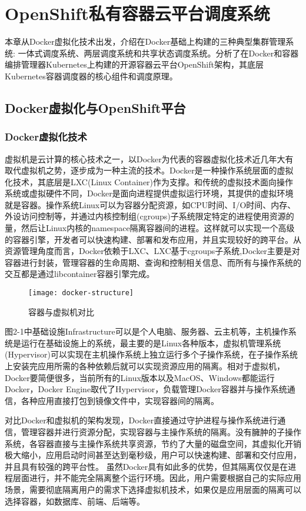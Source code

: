 \chapter{OpenShift私有容器云平台调度系统}
\label{cha:intro}
本章从Docker虚拟化技术出发，介绍在Docker基础上构建的三种典型集群管理系统: 一体式调度系统、两层调度系统和共享状态调度系统。分析了在Docker和容器编排管理器Kubernetes上构建的开源容器云平台OpenShift架构，其底层Kubernetes容器调度器的核心组件和调度原理。

\section{Docker虚拟化与OpenShift平台}
\label{sec:first}
\subsection{Docker虚拟化技术}
虚拟机是云计算的核心技术之一，以Docker为代表的容器虚拟化技术近几年大有取代虚拟机之势，逐步成为一种主流的技术。Docker是一种操作系统层面的虚拟化技术，其底层是LXC(Linux Container)作为支撑。和传统的虚拟技术面向操作系统或虚拟硬件不同，Docker是面向进程提供虚拟运行环境，其提供的虚拟环境就是容器。操作系统Linux可以为容器分配资源，如CPU时间、I/O时间、内存、外设访问控制等，并通过内核控制组(cgroups)子系统限定特定的进程使用资源的量，然后让Linux内核的namespace隔离容器间的进程。这样就可以实现一个高级的容器引擎，开发者可以快速构建、部署和发布应用，并且实现较好的跨平台。从资源管理角度而言，Docker依赖于LXC、LXC基于cgroups子系统,Docker主要是对容器进行封装，管理容器的生命周期、查询和控制相关信息、而所有与操作系统的交互都是通过libcontainer容器引擎完成。
\begin{figure}[H] %
	\centering
	\texttt{[image: docker-structure]}
	\caption{容器与虚拟机对比}
	\label{fig:xfig1}
\end{figure}
图2-1中基础设施Infrastructure可以是个人电脑、服务器、云主机等，主机操作系统是运行在基础设施上的系统，最主要的是Linux各种版本，虚拟机管理系统(Hypervisor)可以实现在主机操作系统上独立运行多个子操作系统，在子操作系统上安装完应用所需的各种依赖后就可以实现资源应用的隔离。相对于虚拟机，Docker要简便很多，当前所有的Linux版本以及MacOS、Windows都能运行Docker，Docker Engine取代了Hypervisor，负载管理Docker容器并与操作系统通信，各种应用直接打包到镜像文件中，实现容器间的隔离。

对比Docker和虚拟机的架构发现，Docker直接通过守护进程与操作系统进行通信，管理容器并进行资源分配，实现容器与主操作系统的隔离。没有臃肿的子操作系统，各容器直接与主操作系统共享资源，节约了大量的磁盘空间，其虚拟化开销极大缩小，应用启动时间甚至达到毫秒级，用户可以快速构建、部署和交付应用，并且具有较强的跨平台性。
虽然Docker具有如此多的优势，但其隔离仅仅是在进程层面进行，并不能完全隔离整个运行环境。因此，用户需要根据自己的实际应用场景，需要彻底隔离用户的需求下选择虚拟机技术，如果仅是应用层面的隔离可以选择容器，如数据库、前端、后端等。
